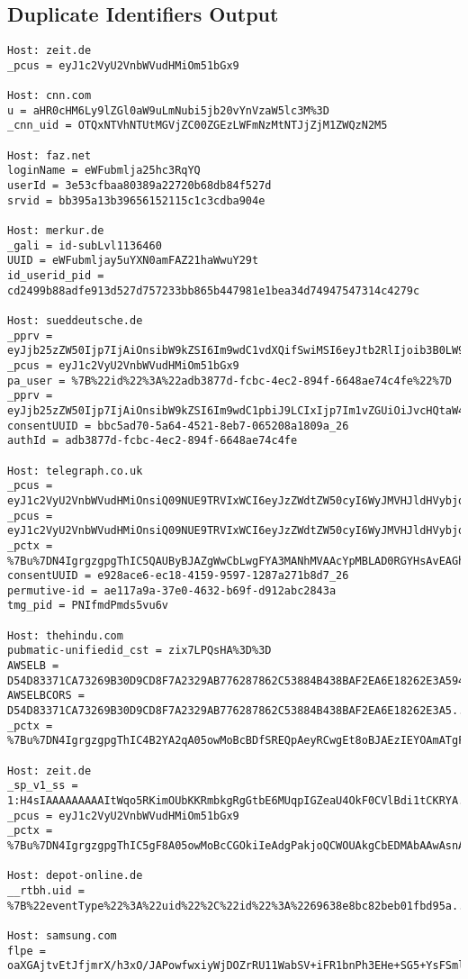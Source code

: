 \subsection{Duplicate Identifiers Output}
\begin{verbatim}
Host: zeit.de
_pcus = eyJ1c2VyU2VnbWVudHMiOm51bGx9

Host: cnn.com
u = aHR0cHM6Ly9lZGl0aW9uLmNubi5jb20vYnVzaW5lc3M%3D
_cnn_uid = OTQxNTVhNTUtMGVjZC00ZGEzLWFmNzMtNTJjZjM1ZWQzN2M5

Host: faz.net
loginName = eWFubmlja25hc3RqYQ
userId = 3e53cfbaa80389a22720b68db84f527d
srvid = bb395a13b39656152115c1c3cdba904e

Host: merkur.de
_gali = id-subLvl1136460
UUID = eWFubmljay5uYXN0amFAZ21haWwuY29t
id_userid_pid = cd2499b88adfe913d527d757233bb865b447981e1bea34d74947547314c4279c

Host: sueddeutsche.de
_pprv = eyJjb25zZW50Ijp7IjAiOnsibW9kZSI6Im9wdC1vdXQifSwiMSI6eyJtb2RlIjoib3B0LW91dC...
_pcus = eyJ1c2VyU2VnbWVudHMiOm51bGx9
pa_user = %7B%22id%22%3A%22adb3877d-fcbc-4ec2-894f-6648ae74c4fe%22%7D
_pprv = eyJjb25zZW50Ijp7IjAiOnsibW9kZSI6Im9wdC1pbiJ9LCIxIjp7Im1vZGUiOiJvcHQtaW4ifS...
consentUUID = bbc5ad70-5a64-4521-8eb7-065208a1809a_26
authId = adb3877d-fcbc-4ec2-894f-6648ae74c4fe

Host: telegraph.co.uk
_pcus = eyJ1c2VyU2VnbWVudHMiOnsiQ09NUE9TRVIxWCI6eyJzZWdtZW50cyI6WyJMVHJldHVybjowZT...
_pcus = eyJ1c2VyU2VnbWVudHMiOnsiQ09NUE9TRVIxWCI6eyJzZWdtZW50cyI6WyJMVHJldHVybjowZT...
_pctx = %7Bu%7DN4IgrgzgpgThIC5QAUByBJAZgWwCbLwgFYA3MANhMVAAcYpMBLAD0RGYHsAvEAGhAAu...
consentUUID = e928ace6-ec18-4159-9597-1287a271b8d7_26
permutive-id = ae117a9a-37e0-4632-b69f-d912abc2843a
tmg_pid = PNIfmdPmds5vu6v

Host: thehindu.com
pubmatic-unifiedid_cst = zix7LPQsHA%3D%3D
AWSELB = D54D83371CA73269B30D9CD8F7A2329AB776287862C53884B438BAF2EA6E18262E3A59471...
AWSELBCORS = D54D83371CA73269B30D9CD8F7A2329AB776287862C53884B438BAF2EA6E18262E3A5...
_pctx = %7Bu%7DN4IgrgzgpgThIC4B2YA2qA05owMoBcBDfSREQpAeyRCwgEt8oBJAEzIEYOAmATgFYA7...

Host: zeit.de
_sp_v1_ss = 1:H4sIAAAAAAAAAItWqo5RKimOUbKKRmbkgRgGtbE6MUqpIGZeaU4OkF0CVlBdi1tCKRYA...
_pcus = eyJ1c2VyU2VnbWVudHMiOm51bGx9
_pctx = %7Bu%7DN4IgrgzgpgThIC5gF8A05owMoBcCGOkiIeAdgPakjoQCWOUAkgCbEDMAbAAwAsnAnDz...

Host: depot-online.de
__rtbh.uid = %7B%22eventType%22%3A%22uid%22%2C%22id%22%3A%2269638e8bc82beb01fbd95a...

Host: samsung.com
flpe = oaXGAjtvEtJfjmrX/h3xO/JAPowfwxiyWjDOZrRU11WabSV+iFR1bnPh3EHe+SG5+YsFSmlophN...


\end{verbatim}
